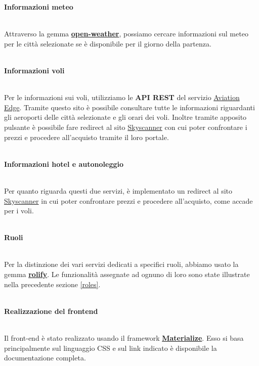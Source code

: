 \documentclass[11pt]{article}
\begin{document}
\begin{large}\textbf{Informazioni meteo}\end{large}\\ 
Attraverso la gemma \href{https://github.com/coderhs/ruby_open_weather_map}{\textbf{open-weather}}, possiamo cercare informazioni sul meteo per le città selezionate se è disponibile per il giorno della partenza.
\\\\
\begin{large}\textbf{Informazioni voli}\end{large}\\
Per le informazioni sui voli, utilizziamo le \textbf{API REST} del servizio \href{https://aviation-edge.com/}{Aviation Edge}. Tramite questo sito è possibile consultare tutte le informazioni riguardanti gli aeroporti delle città selezionate e gli orari dei voli. Inoltre tramite apposito pulsante è possibile fare redirect al sito \href{https://www.skyscanner.it}{Skyscanner} con cui poter confrontare i prezzi e procedere all'acquisto tramite il loro portale.
\\\\
\begin{large}\textbf{Informazioni hotel e autonoleggio}\end{large}\\
Per quanto riguarda questi due servizi, è implementato un redirect al sito \href{https://www.skyscanner.it}{Skyscanner} in cui poter confrontare prezzi e procedere all'acquisto, come accade per i voli.
\\\\
\begin{large}\textbf{Ruoli}\end{large}\\
Per la distinzione dei vari servizi dedicati a specifici ruoli, abbiamo usato la gemma \href{https://github.com/RolifyCommunity/rolify}{\textbf{rolify}}. Le funzionalità assegnate ad ognuno di loro sono state illustrate nella precedente sezione \ref{roles}.
\\\\
\begin{large}\textbf{Realizzazione del frontend}\end{large}\\
Il front-end è stato realizzato usando il framework \href{https://github.com/Dogfalo/materialize}{\textbf{Materialize}}. Esso si basa principalmente sul linguaggio CSS e sul link indicato è disponibile la documentazione completa.
\end{document}
